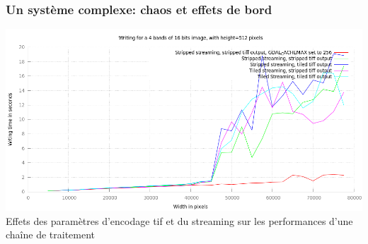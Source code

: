 \documentclass[8pt]{beamer}
\begin{document}
\begin{frame}
\frametitle{Un système complexe: chaos et effets de bord}
\begin{center}
\includegraphics[width=\textwidth]{images/Writing.png}\\
\tiny{Effets des paramètres d'encodage tif et du streaming sur les performances d'une chaîne de traitement}
\end{center}
\end{frame}
\end{document}
